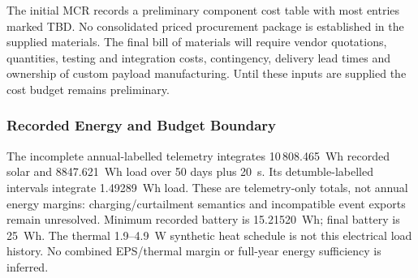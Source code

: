 The initial MCR records a preliminary component cost table with most entries marked TBD. No consolidated priced procurement package is established in the supplied materials. The final bill of materials will require vendor quotations, quantities, testing and integration costs, contingency, delivery lead times and ownership of custom payload manufacturing. Until these inputs are supplied the cost budget remains preliminary.

\subsubsection{Recorded Energy and Budget Boundary}
The incomplete annual-labelled telemetry integrates 10\,808.465~Wh recorded solar and 8847.621~Wh load over 50 days plus 20~s. Its detumble-labelled intervals integrate 1.49289~Wh load. These are telemetry-only totals, not annual energy margins: charging/curtailment semantics and incompatible event exports remain unresolved. Minimum recorded battery is 15.21520~Wh; final battery is 25~Wh. The thermal 1.9--4.9~W synthetic heat schedule is not this electrical load history. No combined EPS/thermal margin or full-year energy sufficiency is inferred.
